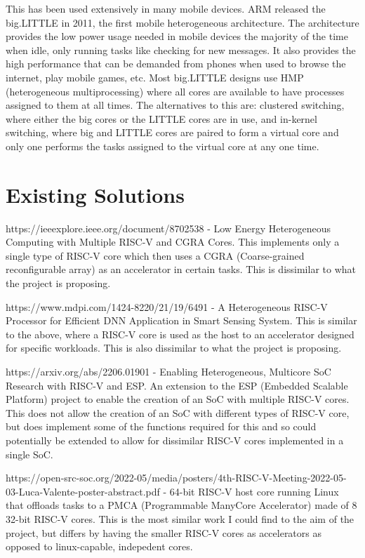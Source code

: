 \documentclass[a4paper,fleqn,11pt]{article}
\begin{document}
This has been used extensively in many mobile devices. ARM released the big.LITTLE in 2011, the first mobile heterogeneous architecture. The architecture provides the low power usage needed in mobile devices the majority of the time when idle, only running tasks like checking for new messages. It also provides the high performance that can be demanded from phones when used to browse the internet, play mobile games, etc. Most big.LITTLE designs use HMP (heterogeneous multiprocessing) where all cores are available to have processes assigned to them at all times. The alternatives to this are: clustered switching, where either the big cores or the LITTLE cores are in use, and in-kernel switching, where big and LITTLE cores are paired to form a virtual core and only one performs the tasks assigned to the virtual core at any one time.

\section{Existing Solutions}
https://ieeexplore.ieee.org/document/8702538 - Low Energy Heterogeneous Computing with Multiple RISC-V and CGRA Cores. This implements only a single type of RISC-V core which then uses a CGRA (Coarse-grained reconfigurable array) as an accelerator in certain tasks. This is dissimilar to what the project is proposing.

https://www.mdpi.com/1424-8220/21/19/6491 - A Heterogeneous RISC-V Processor for Efficient DNN Application in Smart Sensing System. This is similar to the above, where a RISC-V core is used as the host to an accelerator designed for specific workloads. This is also dissimilar to what the project is proposing.

https://arxiv.org/abs/2206.01901 - Enabling Heterogeneous, Multicore SoC Research with RISC-V and ESP. An extension to the ESP (Embedded Scalable Platform) project to enable the creation of an SoC with multiple RISC-V cores. This does not allow the creation of an SoC with different types of RISC-V core, but does implement some of the functions required for this and so could potentially be extended to allow for dissimilar RISC-V cores implemented in a single SoC.

https://open-src-soc.org/2022-05/media/posters/4th-RISC-V-Meeting-2022-05-03-Luca-Valente-poster-abstract.pdf - 64-bit RISC-V host core running Linux that offloads tasks to a PMCA (Programmable ManyCore Accelerator) made of 8 32-bit RISC-V cores. This is the most similar work I could find to the aim of the project, but differs by having the smaller RISC-V cores as accelerators as opposed to linux-capable, indepedent cores.
\end{document}
